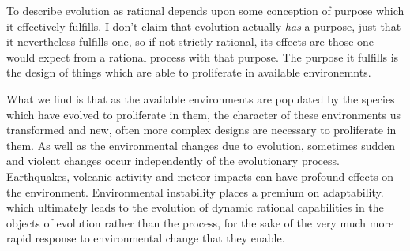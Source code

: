To describe evolution as rational depends upon some conception of purpose which it effectively fulfills.
I don't claim that evolution actually \emph{has} a purpose, just that it nevertheless fulfills one, so if not strictly rational, its effects are those one would expect from a rational process with that purpose.
The purpose it fulfills is the design of things which are able to proliferate in available environemnts.

What we find is that as the available environments are populated by the species which have evolved to proliferate in them, the character of these environments us transformed and new, often more complex designs are necessary to proliferate in them.
As well as the environmental changes due to evolution, sometimes sudden and violent changes occur independently of the evolutionary process.
Earthquakes, volcanic activity and meteor impacts can have profound effects on the environment.
Environmental instability places a premium on adaptability. which ultimately leads to the evolution of dynamic rational capabilities in the objects of evolution rather than the process, for the sake of the very much more rapid response to environmental change that they enable.
